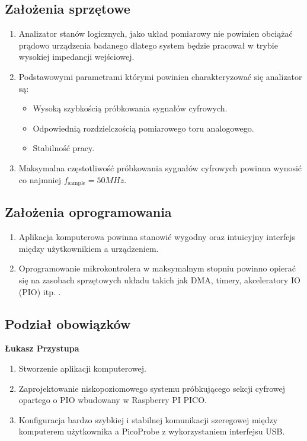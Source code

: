 \subsection{Założenia sprzętowe}
    \begin{enumerate}
        \item Analizator stanów logicznych, jako układ pomiarowy nie powinien obciążać prądowo
        urządzenia badanego dlatego system będzie pracował w trybie
        wysokiej impedancji wejściowej.
        \item Podstawowymi parametrami którymi powinien charakteryzować się analizator są:
        \begin{itemize}
            \item Wysoką szybkością próbkowania sygnałów cyfrowych.
            \item Odpowiednią rozdzielczością pomiarowego toru analogowego.
            \item Stabilność pracy.
        \end{itemize}
        \item Maksymalna częstotliwość próbkowania sygnałów cyfrowych powinna wynosić co najmniej $f_{\text{sample}} = 50MHz$.
    \end{enumerate}

\subsection{Założenia oprogramowania}
    \begin{enumerate}
        \item Aplikacja komputerowa powinna stanowić wygodny oraz intuicyjny interfejs
        między użytkownikiem a urządzeniem.
        \item Oprogramowanie mikrokontrolera w maksymalnym stopniu powinno opierać się na
        zasobach sprzętowych układu takich jak DMA, timery, akceleratory IO (PIO) itp. .
    \end{enumerate}

\subsection{Podział obowiązków}
    \textbf{Łukasz Przystupa}
    \begin{enumerate}
        \item Stworzenie aplikacji komputerowej.
        \item Zaprojektowanie niskopoziomowego systemu próbkującego sekcji cyfrowej opartego o PIO wbudowany w Raspberry PI PICO.
        \item Konfiguracja bardzo szybkiej i stabilnej komunikacji szeregowej między
        komputerem użytkownika a PicoProbe z wykorzystaniem interfejsu USB.
    \end{enumerate}

